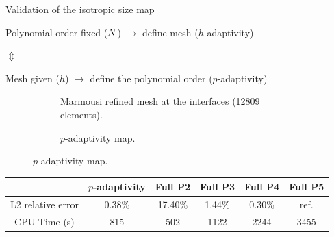 \begin{frame}[noframenumbering]{Validation of the isotropic size map}
  \begin{block}{}
    Polynomial order fixed (${N}$) $\longrightarrow$ define mesh ($h$-adaptivity)
  \end{block}

  $\Updownarrow$

    \begin{block}{}
    Mesh given ($h$) $\longrightarrow$ define the polynomial order ($p$-adaptivity)
    \end{block}

      \vspace{-0.4cm}
\setlength{\modelwidth}{6.5cm}
\begin{figure}[!htbp]
  \renewcommand{\modelfile}{image/iso22_mesh}
     \begin{subfigure}[!htbp]{0.5\textwidth}
        \vspace{0.4cm}
        \hspace{-0.5cm}
         \centering
         
         \caption*{Marmousi refined mesh at the interfaces (12809 elements).}
         \label{marmousi_mesh_padapt}
     \end{subfigure}
     \hspace{-1cm}
     \renewcommand{\modelfile}{image/iso22_order}
     \renewcommand{\cmapmin}{2}
     \renewcommand{\cmapmax}{4}
     \begin{subfigure}[!htbp]{0.5\textwidth}
        \vspace{-0.3cm}
         \centering
         
         \vspace{-0.9cm}
         \caption*{$p$-adaptivity map.}
         \label{marmousi_order_padapt}
     \end{subfigure}

\end{figure}

\vspace{-0.5cm}
\begin{table}[!htbp]
  \small
    \centering
    \begin{tabular}{|c|c|c|c|c|c|}
    \hline
         & $p$-adaptivity & Full P2 & Full P3 & Full P4 & Full P5 \\ \hline
        L2 relative error & \cellcolor{green!30}0.38\%  & \cellcolor{red!30} 17.40\% & \cellcolor{red!30} 1.44\% & \cellcolor{green!30} 0.30\% &  ref. \\ \hline
        CPU Time (s) & \cellcolor{green!30} 815 & 502 & 1122 & \cellcolor{red!30}2244 & 3455 \\ \hline
    \end{tabular}
\end{table}
\end{frame}




